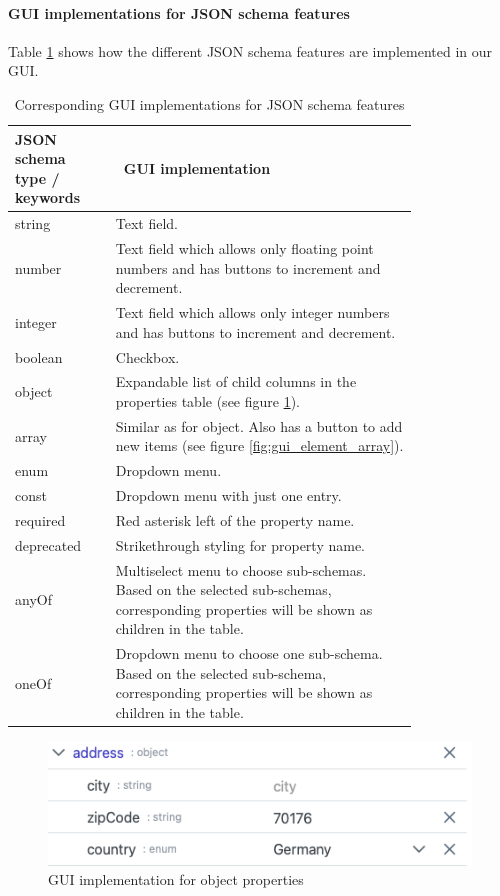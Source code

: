 \paragraph{GUI implementations for JSON schema features} %
Table \ref{table:json_schema_type_component} shows how the different JSON schema features are implemented in our GUI.

\begin{table}
    \centering
    \caption{Corresponding GUI implementations for JSON schema features\label{table:json_schema_type_component}}
    \begin{tabular}{@{}p{0.2\linewidth}p{0.6\linewidth}@{}}
        \toprule
        \textbf{JSON schema type / keywords} & \textbf{\ GUI implementation} \\
        \midrule
        string & Text field. \\
        number & Text field which allows only floating point numbers and has buttons to increment and decrement. \\
        integer & Text field which allows only integer numbers and has buttons to increment and decrement. \\
        boolean & Checkbox.\\
        object & Expandable list of child columns in the properties table (see figure \ref{fig:gui_element_object}). \\
        array & Similar as for object. Also has a button to add new items (see figure \ref{fig:gui_element_array}).\\
        enum & Dropdown menu.\\
        const & Dropdown menu with just one entry.\\
        required & Red asterisk left of the property name.\\
        deprecated & Strikethrough styling for property name.\\
        anyOf & Multiselect menu to choose sub-schemas. Based on the selected sub-schemas, corresponding properties will be shown as children in the table.\\
        oneOf & Dropdown menu to choose one sub-schema. Based on the selected sub-schema, corresponding properties will be shown as children in the table.\\
        \bottomrule
    \end{tabular}
\end{table}

\begin{figure}[!t]
    \centering
    \includegraphics[width=\columnwidth]{figures/gui_element_object}
    \caption{GUI implementation for object properties}
    \label{fig:gui_element_object}
\end{figure}


